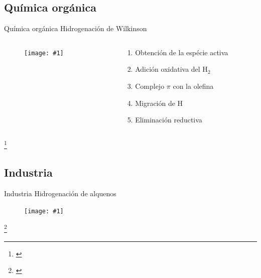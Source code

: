 \documentclass[handout]{beamer}
\newcommand\blfootnote[1]
{%
	\begingroup
	\renewcommand\thefootnote{}\footnote{#1}%
	\addtocounter{footnote}{-1}%
	\endgroup
}
\newcommand{\fcite}[1]{\blfootnote{\cite{#1}}}
\newcommand{\cfigure}[2]
{
	\begin{figure}
		\centering
		\texttt{[image: \#1]}
	\end{figure}
}
\begin{document}
\subsection{Química org\'anica}
\begin{frame}{Qu\'imica org\'anica}
	Hidrogenaci\'on de Wilkinson
	\begin{columns}
		\begin{column}{0.5\textwidth}
			\cfigure{sources/wilkinson.png}{\textwidth}
		\end{column}
		\begin{column}{0.5\textwidth}
			\begin{enumerate}
				\item Obtención de la espécie activa
				\item Adici\'on oxidativa del H$_2$
				\item Complejo $\pi$ con la olefina
				\item Migraci\'on de H
				\item Eliminaci\'on reductiva
			\end{enumerate}
		\end{column}
	\end{columns}
	\fcite{bhaduri2014homogeneous}
\end{frame}


\subsection{Industria}
\begin{frame}{Industria}
	Hidrogenaci\'on de alquenos
	
	\cfigure{sources/hydrogenation.png}{0.8\linewidth}
	\fcite{van2014challenges}
\end{frame}
\end{document}
